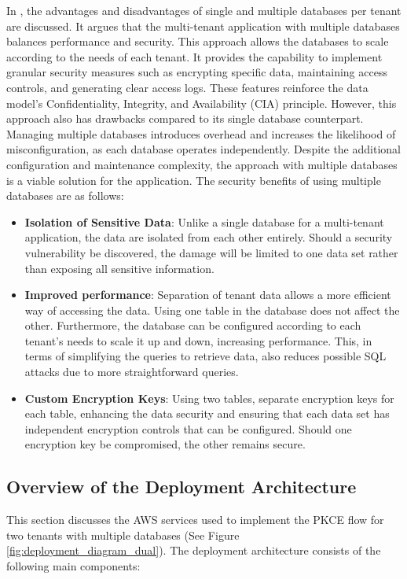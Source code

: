 In \cite{niemela2023implementing}, the advantages and disadvantages of single and multiple databases per tenant are discussed. It argues that the multi-tenant application with multiple databases balances performance and security. This approach allows the databases to scale according to the needs of each tenant. It provides the capability to implement granular security measures such as encrypting specific data, maintaining access controls, and generating clear access logs. These features reinforce the data model's Confidentiality, Integrity, and Availability (CIA) principle. However, this approach also has drawbacks compared to its single database counterpart. Managing multiple databases introduces overhead and increases the likelihood of misconfiguration, as each database operates independently. Despite the additional configuration and maintenance complexity, the approach with multiple databases is a viable solution for the application. The security benefits of using multiple databases are as follows:

\begin{itemize}
    \item \textbf{Isolation of Sensitive Data}: Unlike a single database for a multi-tenant application, the data are isolated from each other entirely. Should a security vulnerability be discovered, the damage will be limited to one data set rather than exposing all sensitive information. 
    
    \item \textbf{Improved performance}: Separation of tenant data allows a more efficient way of accessing the data. Using one table in the database does not affect the other. Furthermore, the database can be configured according to each tenant's needs to scale it up and down, increasing performance. This, in terms of simplifying the queries to retrieve data, also reduces possible SQL attacks due to more straightforward queries.
    
    \item \textbf{Custom Encryption Keys}: Using two tables, separate encryption keys for each table, enhancing the data security and ensuring that each data set has independent encryption controls that can be configured. Should one encryption key be compromised, the other remains secure. 
 
\end{itemize}


\subsection{Overview of the Deployment Architecture}
This section discusses the AWS services used to implement the PKCE flow for two tenants with multiple databases (See Figure \ref{fig:deployment_diagram_dual}). The deployment architecture consists of the following main components:

